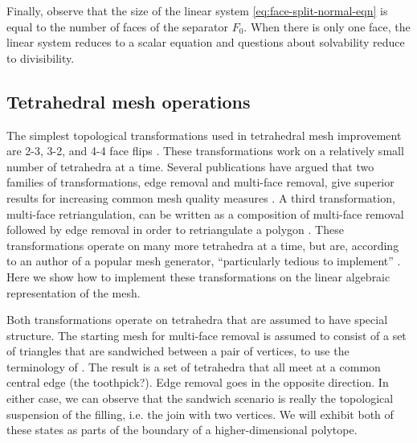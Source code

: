 \documentclass[twocolumn]{article}
\begin{document}
Finally, observe that the size of the linear system \eqref{eq:face-split-normal-eqn} is equal to the number of faces of the separator $F_0$.
When there is only one face, the linear system reduces to a scalar equation and questions about solvability reduce to divisibility.

\subsection{Tetrahedral mesh operations}

The simplest topological transformations used in tetrahedral mesh improvement are 2-3, 3-2, and 4-4 face flips \cite{cheng2013delaunay}.
These transformations work on a relatively small number of tetrahedra at a time.
Several publications have argued that two families of transformations, edge removal and multi-face removal, give superior results for increasing common mesh quality measures \cite{shewchuk2002two, klingner2008aggressive}.
A third transformation, multi-face retriangulation, can be written as a composition of multi-face removal followed by edge removal in order to retriangulate a polygon \cite{misztal2009tetrahedral}.
These transformations operate on many more tetrahedra at a time, but are, according to an author of a popular mesh generator, ``particularly tedious to implement'' \cite{marot2020reviving}.
Here we show how to implement these transformations on the linear algebraic representation of the mesh.

Both transformations operate on tetrahedra that are assumed to have special structure.
The starting mesh for multi-face removal is assumed to consist of a set of triangles that are sandwiched between a pair of vertices, to use the terminology of \cite{shewchuk2002two}.
The result is a set of tetrahedra that all meet at a common central edge (the toothpick?).
Edge removal goes in the opposite direction.
In either case, we can observe that the sandwich scenario is really the topological suspension of the filling, i.e. the join with two vertices.
We will exhibit both of these states as parts of the boundary of a higher-dimensional polytope.
\end{document}
